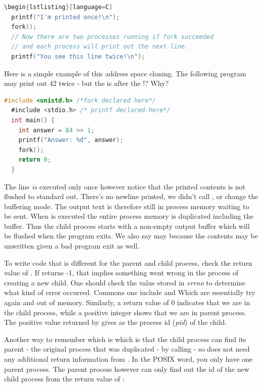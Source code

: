 \begin{itemize}
\begin{lstlisting}[language=C]
\begin{lstlisting}[language=C]
  printf("I'm printed once!\n");
  fork();
  // Now there are two processes running if fork succeeded
  // and each process will print out the next line.
  printf("You see this line twice!\n");
\end{lstlisting}

Here is a simple example of this address space cloning.
The following program may print out 42 twice - but the  is after the !? Why?

\begin{lstlisting}[language=C]
  #include <unistd.h> /*fork declared here*/
  #include <stdio.h> /* printf declared here*/
  int main() {
    int answer = 84 >> 1;
    printf("Answer: %d", answer);
    fork();
    return 0;
  }
\end{lstlisting}

The  line \emph{is} executed only once however notice that the printed contents is not flushed to standard out.
There's no newline printed, we didn't call , or change the buffering mode.
The output text is therefore still in process memory waiting to be sent.
When  is executed the entire process memory is duplicated including the buffer.
Thus the child process starts with a non-empty output buffer which will be flushed when the program exits.
We also say may because the contents may be unwritten given a bad program exit as well.

To write code that is different for the parent and child process, check the return value of .
If  returns -1, that implies something went wrong in the process of creating a new child.
One should check the value stored in \emph{errno} to determine what kind of error occurred.
Commons one include  and  Which are essentially try again and out of memory.
Similarly, a return value of 0 indicates that we are in the child process, while a positive integer shows that we are in parent process.
The positive value returned by  gives as the process id (\emph{pid}) of the child.

Another way to remember which is which is that the child process can find its parent - the original process that was duplicated - by calling  - so does not need any additional return information from .
In the POSIX word, you only have one parent process.
The parent process however can only find out the id of the new child process from the return value of :


\end{itemize}
